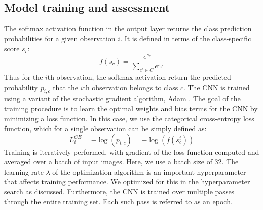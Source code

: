 \documentclass[Journal,letterpaper, SingleSpace, InsideFigs]{ascelike-new}
\begin{document}
\subsection{Model training and assessment}
The softmax activation function in the output layer returns the class prediction probabilities for a given observation $i$. It is defined in terms of the class-specific score $s_c$:
\begin{equation}
    f(s_c) = \frac{e^{s_c}}{\sum\limits_{c' \in C} e^{s_{c'}}}
\end{equation}
Thus for the $i$th observation, the softmax activation return the predicted probability $p_{i,c}$ that the $i$th observation belongs to class $c$.
The CNN is trained using a variant of the stochastic gradient algorithm, Adam \cite{kingma2017adam}.
The goal of the training procedure is to learn the optimal weights and bias terms for the CNN by minimizing a loss function. 
In this case, we use the categorical cross-entropy loss function, which for a single observation can be simply defined as:
\begin{equation}
    L_{i}^{CE} = -  \log( p_{i,c}) = - \log(f(s_c^i))
\end{equation}
Training is iteratively performed, with gradient of the loss function computed and averaged over a batch of input images.
Here, we use a batch size of 32.
The learning rate $\lambda$ of the optimization algorithm is an important hyperparameter that affects training performance.
We optimized for this in the hyperparameter search as discussed.
Furthermore, the CNN is trained over multiple passes through the entire training set.
Each such pass is referred to as an epoch.
\end{document}
